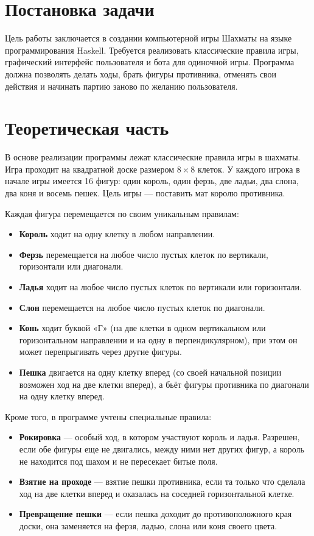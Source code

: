 \section{Постановка задачи}
Цель работы заключается в создании компьютерной игры Шахматы на языке программирования Haskell.
Требуется реализовать классические правила игры, графический интерфейс пользователя и бота для одиночной игры.
Программа должна позволять делать ходы, брать фигуры противника, отменять свои действия и начинать партию заново по желанию пользователя.

\section{Теоретическая часть}
В основе реализации программы лежат классические правила игры в шахматы. Игра проходит на квадратной доске размером $8\times 8$ клеток. У каждого игрока в начале игры имеется 16 фигур: один король, один ферзь, две ладьи, два слона, два коня и восемь пешек. Цель игры --- поставить мат королю противника.

Каждая фигура перемещается по своим уникальным правилам:
\begin{itemize}
    \item \textbf{Король} ходит на одну клетку в любом направлении.
    \item \textbf{Ферзь} перемещается на любое число пустых клеток по вертикали, горизонтали или диагонали.
    \item \textbf{Ладья} ходит на любое число пустых клеток по вертикали или горизонтали.
    \item \textbf{Слон} перемещается на любое число пустых клеток по диагонали.
    \item \textbf{Конь} ходит буквой «Г» (на две клетки в одном вертикальном или горизонтальном направлении и на одну в перпендикулярном), при этом он может перепрыгивать через другие фигуры.
    \item \textbf{Пешка} двигается на одну клетку вперед (со своей начальной позиции возможен ход на две клетки вперед), а бьёт фигуры противника по диагонали на одну клетку вперед.
\end{itemize}

Кроме того, в программе учтены специальные правила:
\begin{itemize}
    \item \textbf{Рокировка} --- особый ход, в котором участвуют король и ладья. Разрешен, если обе фигуры еще не двигались, между ними нет других фигур, а король не находится под шахом и не пересекает битые поля.
    \item \textbf{Взятие на проходе} --- взятие пешки противника, если та только что сделала ход на две клетки вперед и оказалась на соседней горизонтальной клетке.
    \item \textbf{Превращение пешки} --- если пешка доходит до противоположного края доски, она заменяется на ферзя, ладью, слона или коня своего цвета.
\end{itemize}

